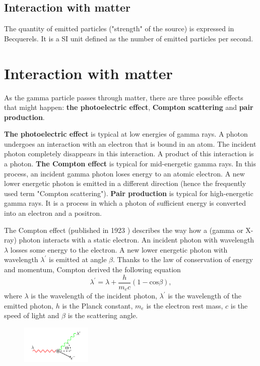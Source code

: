 {  \subsection{Interaction with matter}

  The quantity of emitted particles ("strength" of the source) is expressed in Becquerels.
  It is a SI unit defined as the number of emitted particles per second.

  \section{Interaction with matter}
  As the gamma particle passes through matter, there are three possible effects that might happen:
  \textbf{the photoelectric effect}, \textbf{Compton scattering} and \textbf{pair production}.

  \textbf{The photoelectric effect} is typical at low energies of gamma rays. A photon undergoes an interaction with an electron that is bound in an atom. The incident photon completely disappears in this interaction. A product of this interaction is a photon.
  \textbf{The Compton effect} is typical for mid-energetic gamma rays. In this process, an incident gamma photon loses energy to an atomic electron. A new lower energetic photon is emitted in a different direction (hence the frequently used term "Compton scattering").
  \textbf{Pair production} is typical for high-energetic gamma rays. It is a process in which a photon of sufficient energy is converted into an electron and a positron.

  The Compton effect (published in 1923 \cite{}) describes the way how a (gamma or X-ray) photon interacts with a static electron. An incident photon with wavelength $\lambda$ losses some energy to the electron. A new lower energetic photon with wavelength $\lambda^{\prime}$ is emitted at angle $\beta$. Thanks to the law of conservation of energy and momentum, Compton derived the following equation
  \begin{equation}
      \lambda^{\prime} = \lambda + \frac{h}{m_{e}c}(1-\mathrm{cos} \beta),
  \end{equation}
  where $\lambda$ is the wavelength of the incident photon, $\lambda^{\prime}$ is the wavelength of the emitted photon, $h$ is the Planck constant, $m_{e}$ is the electron rest mass, $c$ is the speed of light and $\beta$ is the scattering angle.

  \begin{figure}[!h]
      \centering
      \includegraphics[width=0.3\textwidth]{./fig/photos/scattering.png}
  \end{figure}


}

